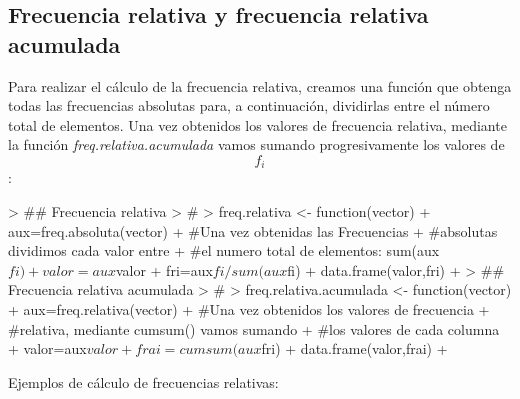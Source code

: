 \documentclass [a4paper] {article}
\begin{document}
\subsection{Frecuencia relativa y frecuencia relativa acumulada}
Para realizar el cálculo de la frecuencia relativa, creamos una función que obtenga todas las frecuencias absolutas para, a continuación, dividirlas entre el número total de elementos.
Una vez obtenidos los valores de frecuencia relativa, mediante la función \textit{freq.relativa.acumulada} vamos sumando progresivamente los valores de \begin{equation} f_i \end{equation}:
\begin{Schunk}
\begin{Sinput}
> ## Frecuencia relativa
> #
> freq.relativa <- function(vector){
+ 	aux=freq.absoluta(vector)
+ 	#Una vez obtenidas las Frecuencias
+ 	#absolutas dividimos cada valor entre
+ 	#el numero total de elementos: sum(aux$fi)
+ 	valor=aux$valor
+ 	fri=aux$fi/sum(aux$fi)
+ 	data.frame(valor,fri)
+ }
> ## Frecuencia relativa acumulada
> #
> freq.relativa.acumulada <- function(vector){
+ 	aux=freq.relativa(vector)
+ 	#Una vez obtenidos los valores de frecuencia
+ 	#relativa, mediante cumsum() vamos sumando
+ 	#los valores de cada columna
+ 	valor=aux$valor
+ 	frai=cumsum(aux$fri)
+ 	data.frame(valor,frai)
+ }
\end{Sinput}
\end{Schunk}
Ejemplos de cálculo de frecuencias relativas:
\end{document}
